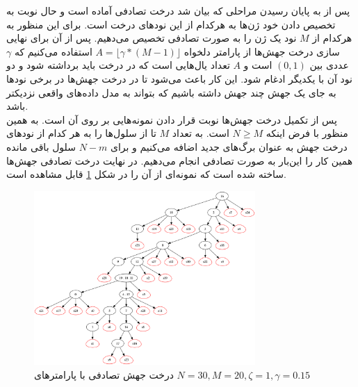 پس از به پایان رسیدن مراحلی که بیان شد درخت تصادفی آماده است و حال نوبت به تخصیص دادن خود ژن‌ها به هرکدام از این نودهای درخت است. برای این منظور به هرکدام از $M$ نود یک ژن را به صورت تصادفی تخصیص می‌دهیم. پس از آن برای نهایی سازی درخت جهش‌ها از پارامتر دلخواه 	$A = \lfloor\gamma*(M-1)\rfloor$ استفاده می‌کنیم که $\gamma$ عددی بین $(0,1)$ است و $A$ تعداد یال‌هایی است که در درخت باید برداشته شود و دو نود آن با یکدیگر ادغام شود. این کار باعث می‌شود تا در درخت جهش‌ها در برخی نودها به جای یک جهش چند جهش داشته باشیم که بتواند به مدل داده‌های واقعی نزدیکتر باشد.
\\
پس از تکمیل درخت جهش‌ها نوبت قرار دادن نمونه‌هایی بر روی آن است. به همین منظور با فرض اینکه $N\ge M$ است. به تعداد $M$ تا از سلول‌ها را به هر کدام از نودهای درخت جهش به عنوان برگ‌های جدید اضافه می‌کنیم و برای $N-m$ سلول باقی مانده همین کار را این‌بار به صورت تصادفی انجام می‌دهیم. در نهایت درخت تصادفی جهش‌ها ساخته شده است که نمونه‌ای از آن را در شکل \ref{fig:mtn30m20z1g0.15} قابل مشاهده است.
\begin{figure}
	\centering
	\includegraphics[width=0.75\textwidth]{img/dataset/s/mt_N30_M20_Z1_G0.15_step3.png}
	\caption{درخت جهش تصادفی با پارامتر‌های $N=30, M=20, \zeta=1, \gamma=0.15$}
	\label{fig:mtn30m20z1g0.15}
\end{figure}

